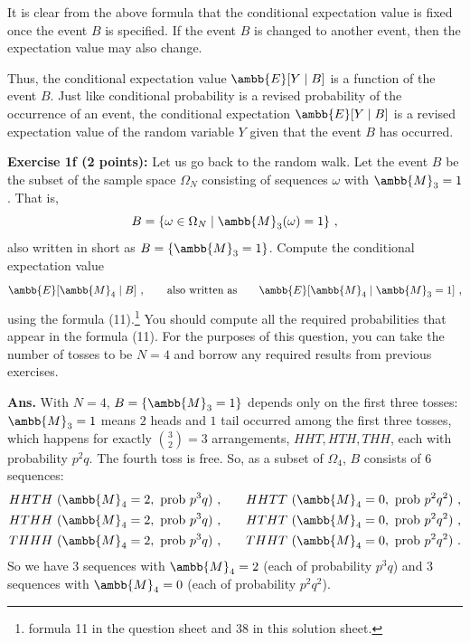 \documentclass[12pt]{article} %
\newcommand{\mE}{\ambb{E}}
\newcommand{\mM}{\ambb{M}}
\newcommand{\Ans}{\textbf{Ans. }}
\begin{document}
It is clear from the above formula that the conditional expectation
value is fixed once the event $B$ is specified. If the event $B$ is
changed to another event, then the expectation value may also change.

Thus, the conditional expectation value $\mE[Y\mid B]$ is a function
of the event $B$. Just like conditional probability is a revised
probability of the occurrence of an event, the conditional expectation
$\mE[Y \mid B]$ is a revised expectation value of the random variable
$Y$ given that the event $B$ has occurred.

\textbf{Exercise 1f (2 points):} Let us go back to the random walk.
Let the event $B$ be the subset of the sample space $\Omega_N$
consisting of sequences $\omega$ with $\mM_3 = 1$. That is,
\begin{equation}
  B = \{\omega \in \Omega_N \mid \mM_3(\omega) = 1\}\ ,
\end{equation}
also written in short as $B=\{\mM_3=1\}$. Compute the conditional
expectation value
\begin{equation}
  \mE[\mM_4 \mid B]\ ,\qquad\text{also written as}\qquad \mE[\mM_4\mid \mM_3=1]\ ,
\end{equation}
using the formula (11).\footnote{formula 11 in the question sheet and 38 in this solution sheet.} You should compute all the required
probabilities that appear in the formula (11). For the purposes of
this question, you can take the number of tosses to be $N=4$ and
borrow any required results from previous exercises.

\Ans With $N=4$, $B=\{\mM_3=1\}$ depends only on the first three
tosses: $\mM_3=1$ means $2$ heads and $1$ tail occurred among the first
three tosses, which happens for exactly $\binom{3}{2}=3$ arrangements,
$HHT,HTH,THH$, each with probability $p^2q$. The fourth toss is free.
So, as a subset of $\Omega_4$, $B$ consists of $6$ sequences:
\begin{align}
  HHTH\ (\mM_4=2,\ \text{prob } p^3q)\ ,&\qquad HHTT\ (\mM_4=0,\ \text{prob } p^2q^2)\ ,\\
  HTHH\ (\mM_4=2,\ \text{prob } p^3q)\ ,&\qquad HTHT\ (\mM_4=0,\ \text{prob } p^2q^2)\ ,\\
  THHH\ (\mM_4=2,\ \text{prob } p^3q)\ ,&\qquad THHT\ (\mM_4=0,\ \text{prob } p^2q^2)\ .
\end{align}
So we have $3$ sequences with $\mM_4=2$ (each of probability $p^3q$)
and $3$ sequences with $\mM_4=0$ (each of probability $p^2q^2$).
\end{document}
